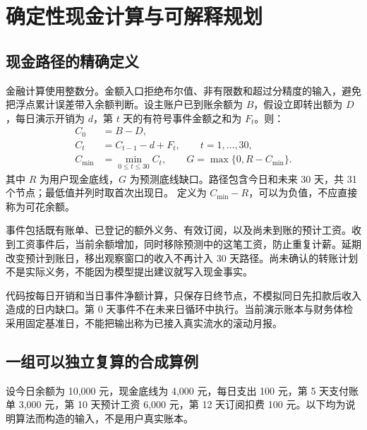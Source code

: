 \sectionstart
\section{确定性现金计算与可解释规划}
\subsection{现金路径的精确定义}
金融计算使用整数分。金额入口拒绝布尔值、非有限数和超过分精度的输入，避免把浮点累计误差带入余额判断。设主账户已到账余额为 $B$，假设立即转出额为 $D$，每日演示开销为 $d$，第 $t$ 天的有符号事件金额之和为 $F_t$。则：
\begin{align}
C_0&=B-D,\\
C_t&=C_{t-1}-d+F_t,\qquad t=1,\ldots,30,\\
C_{\min}&=\min_{0\leq t\leq30}C_t,\qquad
G=\max\{0,R-C_{\min}\}.
\end{align}
其中 $R$ 为用户现金底线，$G$ 为预测底线缺口。路径包含今日和未来 30 天，共 31 个节点；最低值并列时取首次出现日。 定义为 $C_{\min}-R$，可以为负值，不应直接称为可花余额。

事件包括既有账单、已登记的额外义务、有效订阅，以及尚未到账的预计工资。收到工资事件后，当前余额增加，同时移除预测中的这笔工资，防止重复计薪。延期改变预计到账日，移出观察窗口的收入不再计入 30 天路径。尚未确认的转账计划不是实际义务，不能因为模型提出建议就写入现金事实。

代码按每日开销和当日事件净额计算，只保存日终节点，不模拟同日先扣款后收入造成的日内缺口。第 0 天事件不在未来日循环中执行。当前演示账本与财务体检采用固定基准日，不能把输出称为已接入真实流水的滚动月报。

\subsection{一组可以独立复算的合成算例}
设今日余额为 10,000 元，现金底线为 4,000 元，每日支出 100 元，第 5 天支付账单 3,000 元，第 10 天预计工资 6,000 元，第 12 天订阅扣费 100 元。以下均为说明算法而构造的输入，不是用户真实账本。

